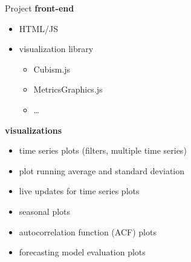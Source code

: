 \documentclass{beamer}
\begin{document}
  
  \begin{frame}{Project}
    \textbf{front-end}
    \begin{itemize}
      \item HTML/JS
      \item visualization library 
      \begin{itemize}
        \item Cubism.js
        \item MetricsGraphics.js
        \item \ldots
      \end{itemize}
    \end{itemize}
    
    \textbf{visualizations}
    \begin{itemize}
     \item time series plots (filters, multiple time series)
     \item plot running average and standard deviation
     \item live updates for time series plots
     \item seasonal plots
     \item autocorrelation function (ACF) plots
     \item forecasting model evaluation plots
    \end{itemize}
  \end{frame}  
\end{document}
